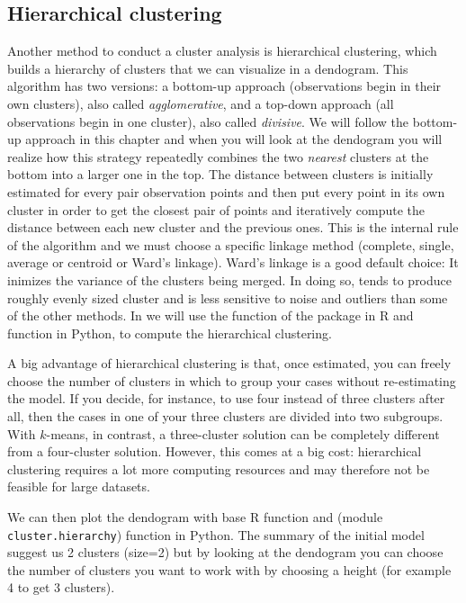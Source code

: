 \subsection{Hierarchical clustering}

Another method to conduct a cluster analysis is hierarchical clustering, which builds a hierarchy of clusters that we can visualize in a dendogram.  This algorithm has two versions: a bottom-up approach (observations begin in their own clusters), also called \textit{agglomerative}, and a top-down approach (all observations begin in one cluster), also called \textit{divisive}. We will follow the bottom-up approach in this chapter and when you will look at the dendogram you will realize how this strategy repeatedly combines the two \textit{nearest} clusters at the bottom into a larger one in the top. The distance between clusters is initially estimated for every pair observation points and then put every point in its own cluster in order to get the closest pair of points and iteratively compute the distance between each new cluster and the previous ones. This is the internal rule of the algorithm and we must choose a specific linkage method (complete, single, average or centroid or Ward's linkage). Ward's linkage is a good default choice: It inimizes the variance of the clusters being merged. In doing so, tends to produce roughly evenly sized cluster and is less sensitive to noise and outliers than some of the other methods. 
In  we will use the function  of the package  in R and  function  in Python, to compute the hierarchical clustering. 

A big advantage of hierarchical clustering is that, once estimated,
you can freely choose the number of clusters in which to group your
cases without re-estimating the model. If you decide, for instance, to
use four instead of three clusters after all, then the cases in one of
your three clusters are divided into two subgroups. With $k$-means, in
contrast, a three-cluster solution can be completely different from a
four-cluster solution. However, this comes at a big cost: hierarchical
clustering requires a lot more computing resources and may therefore
not be feasible for large datasets.


We can then plot the dendogram  with base R function  and  (module \texttt{cluster.hierarchy}) function  in Python. The summary of the initial model suggest us 2 clusters (size=2) but by looking at the dendogram you can choose the number of clusters you want to work with by choosing a height (for example 4 to get 3 clusters). 

